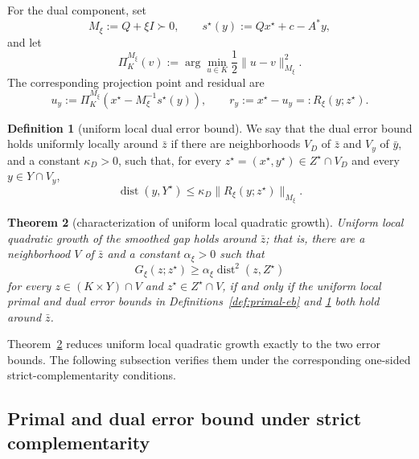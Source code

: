 \documentclass[letterpaper]{article} %
\newtheorem{theorem}{Theorem}[section] %
\theoremstyle{definition}
\newtheorem{definition}[theorem]{Definition}
\theoremstyle{remark}
\begin{document}
For the dual component, set
\[
    M_\xi:=Q+\xi I\succ0,
    \qquad
    s^\star(y):=Qx^\star+c-A^*y,
\]
and let
\[
    \Pi_K^{M_\xi}(v)
    :=
    \arg\min_{u\in K}\frac12\|u-v\|_{M_\xi}^2.
\]
The corresponding projection point and residual are
\[
    u_y
    :=
    \Pi_K^{M_\xi}
    \left(x^\star-M_\xi^{-1}s^\star(y)\right),
    \qquad
    r_y:=x^\star-u_y
    =:R_\xi(y;z^\star).
\]
\begin{definition}[uniform local dual error bound]
\label{def:dual-eb}
We say that the dual error bound holds uniformly locally around $\bar z$
if there are neighborhoods $V_D$ of $\bar z$ and $V_y$ of $\bar y$, and a
constant $\kappa_D>0$, such that, for every
$z^\star=(x^\star,y^\star)\in Z^\star\cap V_D$ and every
$y\in Y\cap V_y$,
\begin{equation}
\label{eq:dual-eb}
    \operatorname{dist}(y,Y^\star)
    \le
    \kappa_D\|R_\xi(y;z^\star)\|_{M_\xi}.
\end{equation}
\end{definition}

\begin{theorem}[characterization of uniform local quadratic growth]
\label{thm:qg}
Uniform local quadratic growth of the smoothed gap holds around $\bar z$;
that is, there are a neighborhood $V$ of $\bar z$ and a constant
$\alpha_\xi>0$ such that
\begin{equation}
\label{eq:uniform-gap-qg}
    G_\xi(z;z^\star)
    \ge
    \alpha_\xi\operatorname{dist}^2(z,Z^\star)
\end{equation}
for every $z\in(K\times Y)\cap V$ and $z^\star\in Z^\star\cap V$, if and
only if the uniform local primal and dual error bounds in
Definitions~\ref{def:primal-eb} and \ref{def:dual-eb} both hold around
$\bar z$.
\end{theorem}

Theorem~\ref{thm:qg} reduces uniform local quadratic growth exactly to the
two error bounds.  The following subsection verifies them under the
corresponding one-sided strict-complementarity conditions.

\subsection{Primal and dual error bound under strict complementarity}
\label{sec:one-sided-sc-error-bounds}
\end{document}
